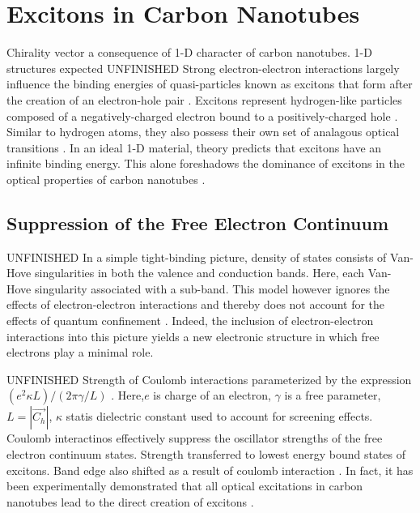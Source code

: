\section{Excitons in Carbon Nanotubes}

Chirality vector a consequence of 1-D character of carbon nanotubes. 1-D structures expected 
{\color{red}UNFINISHED} Strong electron-electron interactions largely influence the binding energies of quasi-particles known as excitons that form after the creation of an electron-hole pair \cite{koch2006semiconductor}. Excitons represent hydrogen-like particles composed of a negatively-charged electron bound to a positively-charged hole \cite{koch2006semiconductor}. Similar to hydrogen atoms, they also possess their own set of analagous optical transitions \cite{koch2006semiconductor}. In an ideal 1-D material, theory predicts that excitons have an infinite binding energy. This alone foreshadows the dominance of excitons in the optical properties of carbon nanotubes \cite{ando2005theory}. 


\subsection{Suppression of the Free Electron Continuum}
{\color{red}UNFINISHED} In a simple tight-binding picture, density of states consists of Van-Hove singularities in both the valence and conduction bands. Here, each Van-Hove singularity associated with a sub-band. This model however ignores the effects of electron-electron interactions and thereby does not account for the effects of quantum confinement \cite{weismanKonoBook}. Indeed, the inclusion of electron-electron interactions into this picture yields a new electronic structure in which free electrons play a minimal role. 
 
{\color{red} UNFINISHED} Strength of Coulomb interactions parameterized by the expression $(e^2 \kappa L)/(2 \pi \gamma/L) $ \cite{ando1997excitons}. Here,$e$ is charge of an electron, $\gamma$ is a free parameter, $L = |\vec{C_h} |$, $\kappa$ statis dielectric constant used to account for screening effects. Coulomb interactinos effectively suppress the oscillator strengths of the free electron continuum states. Strength transferred to lowest energy bound states of excitons. Band edge also shifted as a result of coulomb interaction \cite{ando1997excitons}. In fact, it has been experimentally demonstrated that all optical excitations in carbon nanotubes lead to the direct creation of excitons \cite{wang2005optical}. 

